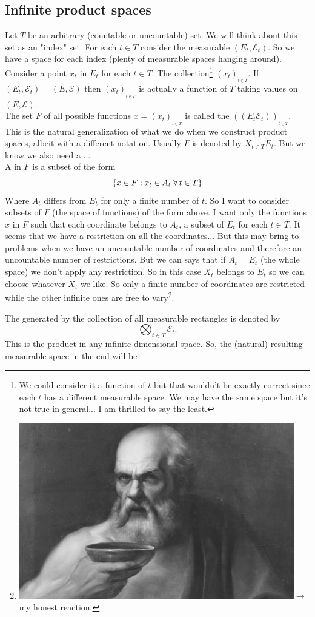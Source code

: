 \documentclass{report}
\begin{document}
\subsection{Infinite product spaces}
Let $T$ be an arbitrary (countable or uncountable) set. We will think about this set as an "index" set. For each $t\in T$ consider the measurable $(E_t,\mathscr{E}_t)$. So we have a space for each index (plenty of measurable spaces hanging around). Consider a point $x_t$ in $E_t$ for each $t\in T$. The collection\footnote{We could consider it a function of $t$ but that wouldn't be exactly correct since each $t$ has a different measurable space. We may have the same space but it's not true in general... I am thrilled to say the least.} $(x_t)_{_{t\in T}}$. If  $(E_t,\mathscr{E}_t)=(E,\mathscr{E})$ then $(x_t)_{_{t\in T}}$ is actually a function of $T$ taking values on $(E,\mathscr{E})$. \\
The set $F$ of all possible functions $x=(x_t)_{_{t\in T}}$ is called the  $\left((E_t\mathscr{E}_t)\right)_{_{t\in T}}$.\\ This is the natural generalization of what we do when we construct product spaces, albeit with a different notation. Usually $F$ is denoted by $X_{t\in T}E_t$. But we know we also need a \sa...\\
A  in $F$ is a subset of the form
\[\{x\in F:x_t\in A_t \;\forall\, t\in T\}\]
Where $A_t$ differs from $E_t$ for only a finite number of $t$. So I want to consider subsets of $F$ (the space of functions) of the form above. I want only the functions $x$ in $F$ such that each coordinate belongs to $A_t$, a subset of $E_t$ for each $t\in T$. It seems that we have a restriction on all the coordinates... But this may bring to problems when we have an uncountable number of coordinates and therefore an uncountable number of restrictions. But we can says that if $A_t=E_t$ (the whole space) we don't apply any restriction. So in this case  $X_t$ belongs to $E_t$ so we can choose whatever $X_t$ we like. So only a finite number of coordinates are restricted while the other infinite ones are free to vary\footnote{\includegraphics[width=0.08\linewidth]{screenshot003}$\rightarrow$ my honest reaction.
}. \par
The \sa{} generated by the collection of all measurable rectangles is denoted by 
\[\bigotimes_{t\in T}\mathscr{E}_t.\]
This is the product \sa{} in any infinite-dimensional space. So, the (natural) resulting measurable space in the end will be
\end{document}
